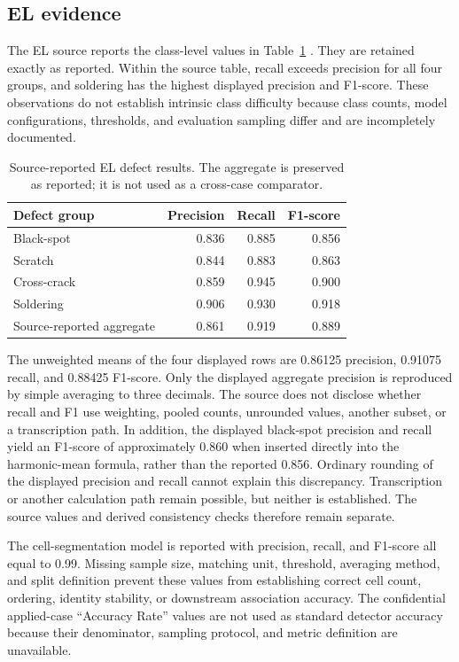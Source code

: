 \documentclass[12pt,a4paper]{report}
\begin{document}
\subsection{EL evidence}

The EL source reports the class-level values in Table~\ref{tab:ch07-el-results} \citep{src002}. They are retained exactly as reported. Within the source table, recall exceeds precision for all four groups, and soldering has the highest displayed precision and F1-score. These observations do not establish intrinsic class difficulty because class counts, model configurations, thresholds, and evaluation sampling differ and are incompletely documented.

\begin{table}[htbp]
\centering
\caption{Source-reported EL defect results. The aggregate is preserved as reported; it is not used as a cross-case comparator.}
\label{tab:ch07-el-results}
\begin{tabular}{lrrr}
\toprule
Defect group & Precision & Recall & F1-score \\
\midrule
Black-spot & 0.836 & 0.885 & 0.856 \\
Scratch & 0.844 & 0.883 & 0.863 \\
Cross-crack & 0.859 & 0.945 & 0.900 \\
Soldering & 0.906 & 0.930 & 0.918 \\
\midrule
Source-reported aggregate & 0.861 & 0.919 & 0.889 \\
\bottomrule
\end{tabular}
\end{table}

The unweighted means of the four displayed rows are 0.86125 precision, 0.91075 recall, and 0.88425 F1-score. Only the displayed aggregate precision is reproduced by simple averaging to three decimals. The source does not disclose whether recall and F1 use weighting, pooled counts, unrounded values, another subset, or a transcription path. In addition, the displayed black-spot precision and recall yield an F1-score of approximately 0.860 when inserted directly into the harmonic-mean formula, rather than the reported 0.856. Ordinary rounding of the displayed precision and recall cannot explain this discrepancy. Transcription or another calculation path remain possible, but neither is established. The source values and derived consistency checks therefore remain separate.

The cell-segmentation model is reported with precision, recall, and F1-score all equal to 0.99. Missing sample size, matching unit, threshold, averaging method, and split definition prevent these values from establishing correct cell count, ordering, identity stability, or downstream association accuracy. The confidential applied-case ``Accuracy Rate'' values are not used as standard detector accuracy because their denominator, sampling protocol, and metric definition are unavailable.
\end{document}

